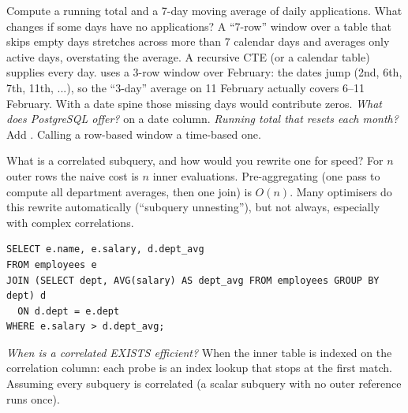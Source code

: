 \begin{qa}{\classic Compute a running total and a 7-day moving average of daily applications. What changes if some days have no applications?}
\why A ``7-row'' window over a table that skips empty days stretches across more than 7 calendar days and averages only active days, overstating the
average. A recursive CTE (or a calendar table) supplies every day.
\worked {} uses a 3-row window over February: the dates jump (2nd, 6th, 7th, 11th, ...), so the ``3-day'' average on 11 February actually
covers 6--11 February. With a date spine those missing days would contribute zeros.
\pushes \emph{What does PostgreSQL offer?}  on a date column. \emph{Running total that
resets each month?} Add .
\pitfall Calling a row-based window a time-based one.
\end{qa}

\begin{qa}{What is a correlated subquery, and how would you rewrite one for speed?}
\why For $n$ outer rows the naive cost is $n$ inner evaluations. Pre-aggregating (one pass to compute all department averages, then one join) is $O(n)$.
Many optimisers do this rewrite automatically (``subquery unnesting''), but not always, especially with complex correlations.
\worked
\begin{lstlisting}[style=sql]
SELECT e.name, e.salary, d.dept_avg
FROM employees e
JOIN (SELECT dept, AVG(salary) AS dept_avg FROM employees GROUP BY dept) d
  ON d.dept = e.dept
WHERE e.salary > d.dept_avg;
\end{lstlisting}
\pushes \emph{When is a correlated EXISTS efficient?} When the inner table is indexed on the correlation column: each probe is an index lookup that stops
at the first match.
\pitfall Assuming every subquery is correlated (a scalar subquery with no outer reference runs once).
\end{qa}

